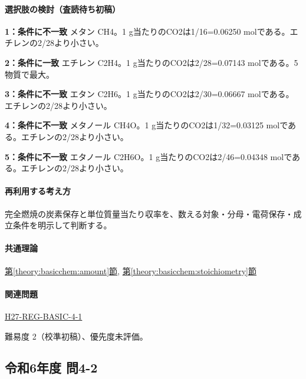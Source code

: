 \paragraph{選択肢の検討（査読待ち初稿）}\mbox{}\par

\noindent\textbf{1：条件に不一致} メタン CH4。1 g当たりのCO2は1/16=\allowbreak{}0.06250 molである。エチレンの2/28より小さい。\par

\noindent\textbf{2：条件に一致} エチレン C2H4。1 g当たりのCO2は2/28=\allowbreak{}0.07143 molである。5物質で最大。\par

\noindent\textbf{3：条件に不一致} エタン C2H6。1 g当たりのCO2は2/30=\allowbreak{}0.06667 molである。エチレンの2/28より小さい。\par

\noindent\textbf{4：条件に不一致} メタノール CH4O。1 g当たりのCO2は1/32=\allowbreak{}0.03125 molである。エチレンの2/28より小さい。\par

\noindent\textbf{5：条件に不一致} エタノール C2H6O。1 g当たりのCO2は2/46=\allowbreak{}0.04348 molである。エチレンの2/28より小さい。\par

\paragraph{再利用する考え方} 完全燃焼の炭素保存と単位質量当たり収率を、数える対象・分母・電荷保存・成立条件を明示して判断する。

\paragraph{共通理論} \hyperref[theory:basicchem:amount]{第\ref*{theory:basicchem:amount}節}, \hyperref[theory:basicchem:stoichiometry]{第\ref*{theory:basicchem:stoichiometry}節}

\paragraph{関連問題} \hyperref[q:h27-reg-basic-4-1]{H27-REG-BASIC-4-1}

\par 難易度 2（校準初稿）、優先度未評価。

\subsection{令和6年度 問4-2}
\label{q:r06-reg-basic-4-2}

